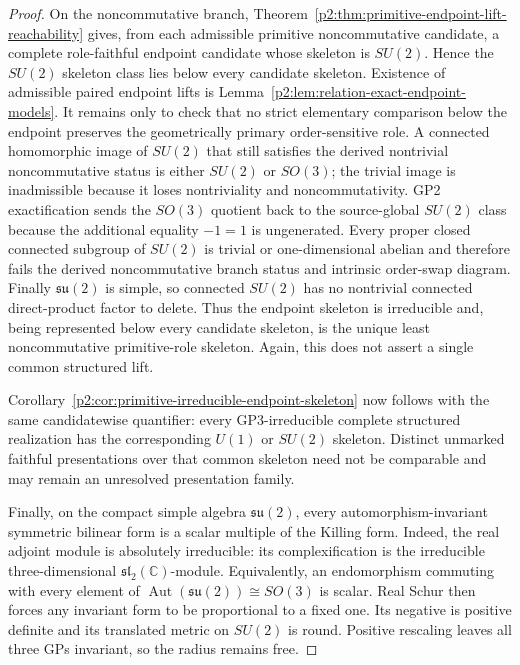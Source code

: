 \documentclass[12pt,a4paper]{article}
\begin{document}
\begin{proof}
On the noncommutative branch,
Theorem~\ref{p2:thm:primitive-endpoint-lift-reachability} gives, from each
admissible primitive noncommutative candidate, a complete role-faithful
endpoint candidate whose skeleton is \(SU(2)\).  Hence the \(SU(2)\)
skeleton class lies below every candidate
skeleton.  Existence of admissible paired endpoint lifts is
Lemma~\ref{p2:lem:relation-exact-endpoint-models}.  It remains only to check
that no strict elementary comparison below the endpoint preserves the
geometrically primary order-sensitive role.  A connected homomorphic image of \(SU(2)\) that still satisfies
the derived nontrivial noncommutative status is either \(SU(2)\) or \(SO(3)\); the
trivial image is inadmissible because it loses nontriviality and
noncommutativity.  GP2 exactification sends the \(SO(3)\) quotient back to the
source-global \(SU(2)\) class because the additional equality \(-1=1\) is
ungenerated.  Every proper closed connected subgroup of \(SU(2)\) is trivial
or one-dimensional abelian and therefore fails the derived noncommutative
branch status and intrinsic order-swap diagram.
Finally \(\mathfrak{su}(2)\) is simple, so connected \(SU(2)\) has no
nontrivial connected direct-product factor to delete.  Thus the endpoint skeleton is irreducible and, being represented below every
candidate skeleton, is the unique least noncommutative primitive-role
skeleton.  Again, this does not assert a single common structured lift.

Corollary~\ref{p2:cor:primitive-irreducible-endpoint-skeleton} now follows
with the same candidatewise quantifier: every GP3-irreducible complete
structured realization has the corresponding \(U(1)\) or \(SU(2)\) skeleton.
Distinct unmarked faithful presentations over that common skeleton need not be
comparable and may remain an unresolved presentation family.

Finally, on the compact simple algebra \(\mathfrak{su}(2)\), every
automorphism-invariant symmetric bilinear form is a scalar multiple of the
Killing form.  Indeed, the real adjoint module is absolutely irreducible: its
complexification is the irreducible three-dimensional
\(\mathfrak{sl}_2(\mathbb C)\)-module.  Equivalently, an endomorphism commuting
with every element of
\(\operatorname{Aut}(\mathfrak{su}(2))\cong SO(3)\) is scalar.  Real Schur
then forces any invariant form to be proportional to a fixed one.  Its
negative is positive definite and its translated metric on
\(SU(2)\) is round.  Positive rescaling leaves all three GPs invariant, so
the radius remains free.
\end{proof}
\end{document}

